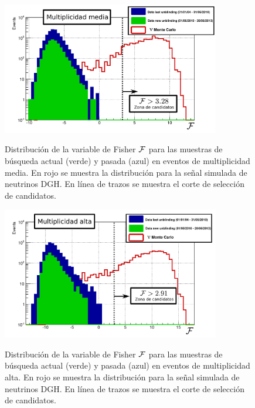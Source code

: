 	\begin{figure}[ht!]
		\begin{center}
			\includegraphics[width=0.85\textwidth]{fig/resultadosAuger/DGH_Retrining_May2012_2_med_Nor_mod}\\
			\caption{\label{fig:unblindingDGHM}
			Distribuci\'on de la variable de Fisher $\cal F$ para las muestras de b\'usqueda actual (verde) y pasada (azul) en eventos de multiplicidad media. En rojo se muestra la distribuci\'on para la se\~nal simulada de neutrinos DGH.
			En l\'inea de trazos se muestra el corte de selecci\'on de candidatos.
			}
		\end{center}
	\end{figure}
	\begin{figure}[ht!]
		\begin{center}
			\includegraphics[width=0.85\textwidth]{fig/resultadosAuger/DGH_Retrining_May2012_2_high_Nor_mod}\\
			\caption{\label{fig:unblindingDGHH}
			Distribuci\'on de la variable de Fisher $\cal F$ para las muestras de b\'usqueda actual (verde) y pasada (azul) en eventos de multiplicidad alta. En rojo se muestra la distribuci\'on para la se\~nal simulada de neutrinos DGH.
			En l\'inea de trazos se muestra el corte de selecci\'on de candidatos.
			}
		\end{center}
	\end{figure}
